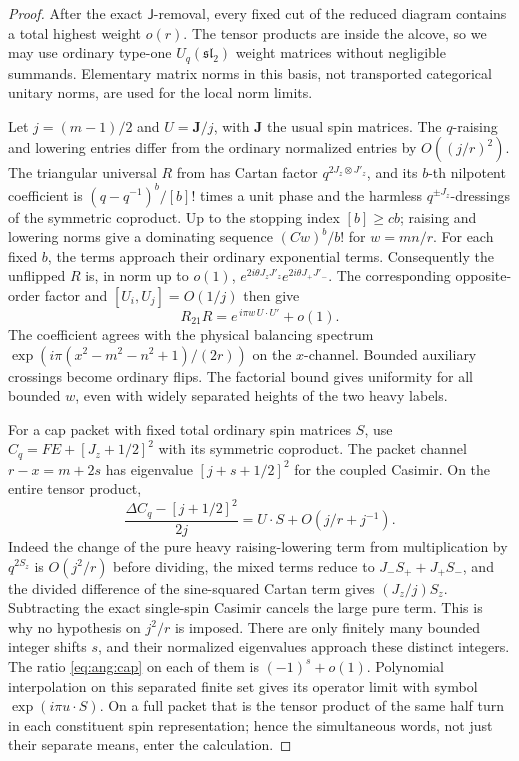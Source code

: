 \begin{proof}
After the exact \(\mathsf J\)-removal, every fixed cut of the reduced diagram contains a total highest weight \(o(r)\). The tensor products are inside the alcove, so we may use ordinary type-one \(U_q(\mathfrak{sl}_2)\) weight matrices without negligible summands. Elementary matrix norms in this basis, not transported categorical unitary norms, are used for the local norm limits.

Let \(j=(m-1)/2\) and \(U=\mathbf J/j\), with \(\mathbf J\) the usual spin matrices. The \(q\)-raising and lowering entries differ from the ordinary normalized entries by \(O((j/r)^2)\). The triangular universal \(R\) from \cite[Sec.~7]{RT1990} has Cartan factor \(q^{2J_z\otimes J'_z}\), and its \(b\)-th nilpotent coefficient is \((q-q^{-1})^b/[b]!\) times a unit phase and the harmless \(q^{\pm J_z}\)-dressings of the symmetric coproduct. Up to the stopping index \([b]\geq c b\); raising and lowering norms give a dominating sequence \((Cw)^b/b!\) for \(w=mn/r\). For each fixed \(b\), the terms approach their ordinary exponential terms. Consequently the unflipped \(R\) is, in norm up to \(o(1)\), \(e^{2i\theta J_zJ'_z}e^{2i\theta J_+J'_-}\). The corresponding opposite-order factor and \([U_i,U_j]=O(1/j)\) then give
\[
                  R_{21}R
                         =e^{\,i\pi w\,U\cdot U'}+o(1).
\]
The coefficient agrees with the physical balancing spectrum
\(\exp(i\pi(x^2-m^2-n^2+1)/(2r))\) on the \(x\)-channel. Bounded auxiliary crossings become ordinary flips. The factorial bound gives uniformity for all bounded \(w\), even with widely separated heights of the two heavy labels.

For a cap packet with fixed total ordinary spin matrices \(S\), use \(C_q=FE+[J_z+1/2]^2\) with its symmetric coproduct. The packet channel \(r-x=m+2s\) has eigenvalue \([j+s+1/2]^2\) for the coupled Casimir. On the entire tensor product,
\[
 \frac{\Delta C_q-[j+1/2]^2}{2j}
                             = U\cdot S+O(j/r+j^{-1}).
\]
Indeed the change of the pure heavy raising-lowering term from multiplication by \(q^{2S_z}\) is \(O(j^2/r)\) before dividing, the mixed terms reduce to \(J_-S_++J_+S_-\), and the divided difference of the sine-squared Cartan term gives \((J_z/j)S_z\). Subtracting the exact single-spin Casimir cancels the large pure term. This is why no hypothesis on \(j^2/r\) is imposed. There are only finitely many bounded integer shifts \(s\), and their normalized eigenvalues approach these distinct integers. The ratio \eqref{eq:ang:cap} on each of them is \((-1)^s+o(1)\). Polynomial interpolation on this separated finite set gives its operator limit with symbol \(\exp(i\pi u\cdot S)\). On a full packet that is the tensor product of the same half turn in each constituent spin representation; hence the simultaneous words, not just their separate means, enter the calculation.


\end{proof}
